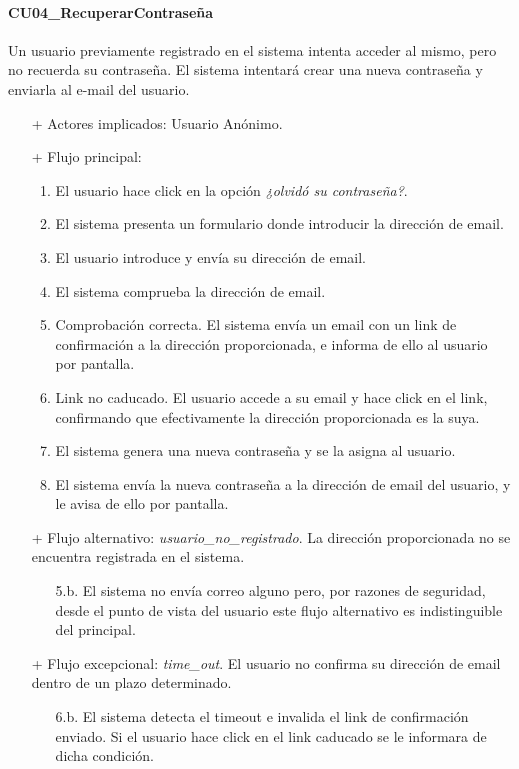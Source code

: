 \documentclass[a4paper,12pt,twoside,openright]{report}
\begin{document}
            \paragraph{CU04\_RecuperarContraseña}
                Un usuario previamente registrado en el sistema intenta acceder al mismo, pero no recuerda su contraseña. El sistema intentará crear una nueva contraseña y enviarla al e-mail del usuario.
                \begin{itemize}
                    \item[+] Actores implicados: Usuario Anónimo.
                    \item[+] Flujo principal:
                    \begin{enumerate}
                        \item El usuario hace click en la opción \emph{¿olvidó su contraseña?}.
                        \item El sistema presenta un formulario donde introducir la dirección de email.
                        \item El usuario introduce y envía su dirección de email.
                        \item El sistema comprueba la dirección de email.
                        \item Comprobación correcta. El sistema envía un email con un link de confirmación a la dirección proporcionada, e informa de ello al usuario por pantalla.
                        \item Link no caducado. El usuario accede a su email y hace click en el link, confirmando que efectivamente la dirección proporcionada es la suya.
                        \item El sistema genera una nueva contraseña y se la asigna al usuario.
                        \item El sistema envía la nueva contraseña a la dirección de email del usuario, y le avisa de ello por pantalla.
                    \end{enumerate}
                    \item[+] Flujo alternativo: \emph{usuario\_no\_registrado}. La dirección proporcionada no se encuentra registrada en el sistema.
                    \begin{itemize}
                        \item[5.b.] El sistema no envía correo alguno pero, por razones de seguridad, desde el punto de vista del usuario este flujo alternativo es indistinguible del principal.
                    \end{itemize}
                    \item[+] Flujo excepcional: \emph{time\_out}. El usuario no confirma su dirección de email dentro de un plazo determinado.
                    \begin{itemize}
                        \item[6.b.] El sistema detecta el timeout e invalida el link de confirmación enviado. Si el usuario hace click en el link caducado se le informara de dicha condición.
                    \end{itemize}
                \end{itemize}
\end{document}
